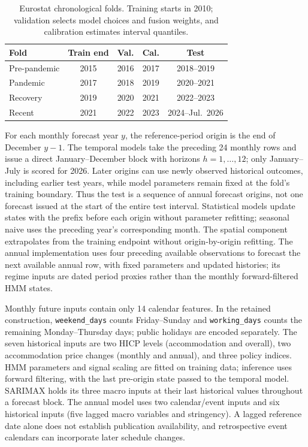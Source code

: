 \documentclass[sigconf]{acmart}
\begin{document}
\begin{table}[!t]
\centering
\caption{Eurostat chronological folds. Training starts in 2010; validation selects model choices and fusion weights, and calibration estimates interval quantiles.}
\label{tab:protocol_folds}
\scriptsize
\setlength{\tabcolsep}{3pt}
\begin{tabular}{@{}lcccc@{}}
\toprule
\textbf{Fold} & \textbf{Train end} & \textbf{Val.} & \textbf{Cal.} & \textbf{Test} \\
\midrule
Pre-pandemic & 2015 & 2016 & 2017 & 2018--2019 \\
Pandemic & 2017 & 2018 & 2019 & 2020--2021 \\
Recovery & 2019 & 2020 & 2021 & 2022--2023 \\
Recent & 2021 & 2022 & 2023 & 2024--Jul.\ 2026 \\
\bottomrule
\end{tabular}
\end{table}

For each monthly forecast year $y$, the reference-period origin is the end of December $y-1$. The temporal models take the preceding 24 monthly rows and issue a direct January--December block with horizons $h=1,\ldots,12$; only January--July is scored for 2026. Later origins can use newly observed historical outcomes, including earlier test years, while model parameters remain fixed at the fold's training boundary. Thus the test is a sequence of annual forecast origins, not one forecast issued at the start of the entire test interval. Statistical models update states with the prefix before each origin without parameter refitting; seasonal naive uses the preceding year's corresponding month. The spatial component extrapolates from the training endpoint without origin-by-origin refitting. The annual implementation uses four preceding available observations to forecast the next available annual row, with fixed parameters and updated histories; its regime inputs are dated period proxies rather than the monthly forward-filtered HMM states.

Monthly future inputs contain only 14 calendar features. In the retained construction, \texttt{weekend\_days} counts Friday--Sunday and \texttt{working\_days} counts the remaining Monday--Thursday days; public holidays are encoded separately. The seven historical inputs are two HICP levels (accommodation and overall), two accommodation price changes (monthly and annual), and three policy indices. HMM parameters and signal scaling are fitted on training data; inference uses forward filtering, with the last pre-origin state passed to the temporal model. SARIMAX holds its three macro inputs at their last historical values throughout a forecast block. The annual model uses two calendar/event inputs and six historical inputs (five lagged macro variables and stringency). A lagged reference date alone does not establish publication availability, and retrospective event calendars can incorporate later schedule changes.
\end{document}
